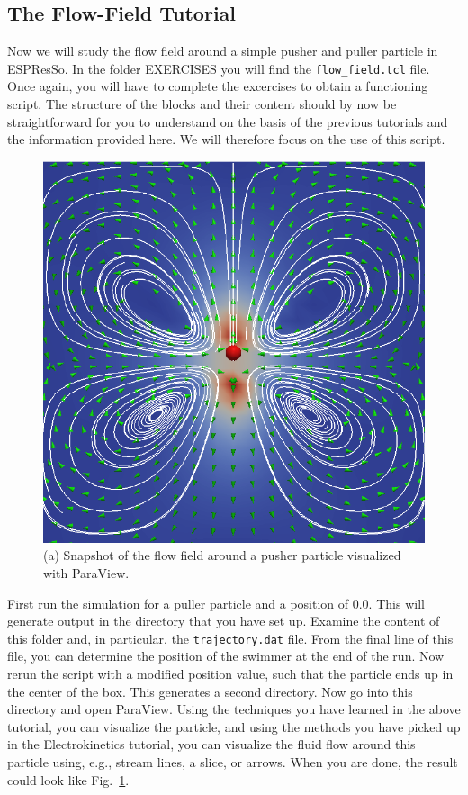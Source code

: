 \documentclass[aip,jcp,reprint,a4paper,onecolumn,amsmath]{revtex4-1}
\newcommand\code{\lstinline}
\newcommand{\es}{\mbox{\textsf{ESPResSo}}\xspace}
\begin{document}
\subsection{\label{sub:fftut}The Flow-Field Tutorial}

Now we will study the flow field around a simple pusher and puller particle in \es{}. In the folder EXERCISES you will find the \code{flow_field.tcl} file. Once again, you will have to complete the excercises to obtain a functioning script. The structure of the blocks and their content should by now be straightforward for you to understand on the basis of the previous tutorials and the information provided here. We will therefore focus on the use of this script. 

\begin{figure}[!htb]
\begin{center}
\includegraphics[scale=0.75]{FIGURES/flow_field}
\end{center}
\caption{\label{fig:flow_field}(a) Snapshot of the flow field around a pusher particle visualized with ParaView.}
\end{figure}

First run the simulation for a puller particle and a position of 0.0. This will generate output in the directory that you have set up. Examine the content of this folder and, in particular, the \code{trajectory.dat} file. From the final line of this file, you can determine the position of the swimmer at the end of the run. Now rerun the script with a modified position value, such that the particle ends up in the center of the box. This generates a second directory. Now go into this directory and open ParaView. Using the techniques you have learned in the above tutorial, you can visualize the particle, and using the methods you have picked up in the Electrokinetics tutorial, you can visualize the fluid flow around this particle using, e.g., stream lines, a slice, or arrows. When you are done, the result could look like Fig.~\ref{fig:flow_field}.
\end{document}
